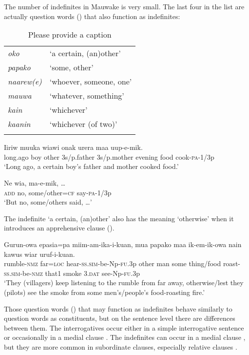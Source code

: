 The number of indefinites in Mauwake is very small. The last four in the list are actually question words () that also function as indefinites:

\begin{table}
\caption{Please provide a caption}
 
\begin{tabular}{>{\itshape}ll}
\mytoprule
oko &`a certain, (an)other'\\
papako &`some, other'\\
naarew(e) &`whoever, someone, one'\\
mauwa &`whatever, something'\\
kain &`whichever'\\
kaanin &`whichever (of two)'\\
\mybottomrule
\end{tabular}
\end{table}


\ea%
\label{ex:3:x641}
\gll Iiriw muuka  wiawi onak urera maa uup-e-mik.\\
long.ago boy other 3s/p.father 3s/p.mother evening food cook-\textsc{pa}-1/3p\\
\glt`Long ago, a certain boy's father and mother cooked food.'
\z

\ea%
\label{ex:3:x642}
\gll Ne wia,  ma-e-mik, {\dots} \\
\textsc{add} no, some/other=\textsc{cf} say-\textsc{pa}-1/3p\\
\glt`But no, some/others said, {\dots}'
\z

The indefinite  `a certain, (an)other' also has the meaning `otherwise' when it introduces an apprehensive clause ().

\ea%
\label{ex:3:x741}
\gll Gurun-owa epasia=pa miim-am-ika-i-kuan,  mua papako maa ik-em-ik-owa nain kawus wiar uruf-i-kuan.\\
rumble-\textsc{nmz} far=\textsc{loc} hear-\textsc{ss}.\textsc{sim}-be-Np-\textsc{fu}.3p other man some thing/food roast-\textsc{ss}.\textsc{sim}-be-\textsc{nmz} that1 smoke 3.\textsc{dat} see-Np-\textsc{fu}.3p\\
\glt`They (villagers) keep listening to the rumble from far away, otherwise/lest they (pilots) see the smoke from some men's/people's food-roasting fire.'
\z

Those question words () that may function as indefinites behave similarly to question words as  constituents, but on the sentence level there are differences between them. The interrogatives occur either in a simple interrogative sentence or occasionally in a medial clause . The indefinites can occur in a medial clause , but they are more common in subordinate clauses, especially relative clauses . 

